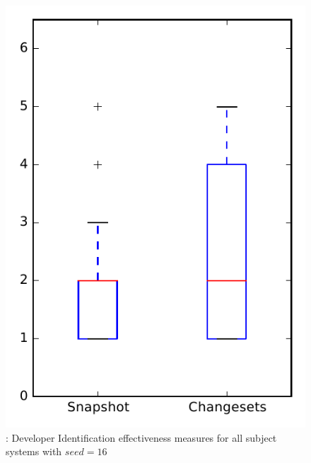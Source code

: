 
\begin{figure}
\centering
\includegraphics[height=0.4\textheight]{figures/dit_seed/rq1_overview_16}
\caption{\rtwo: Developer Identification effectiveness measures for all subject systems with $seed=16$}
\label{fig:dit_seed:rq1:overview}
\end{figure}
